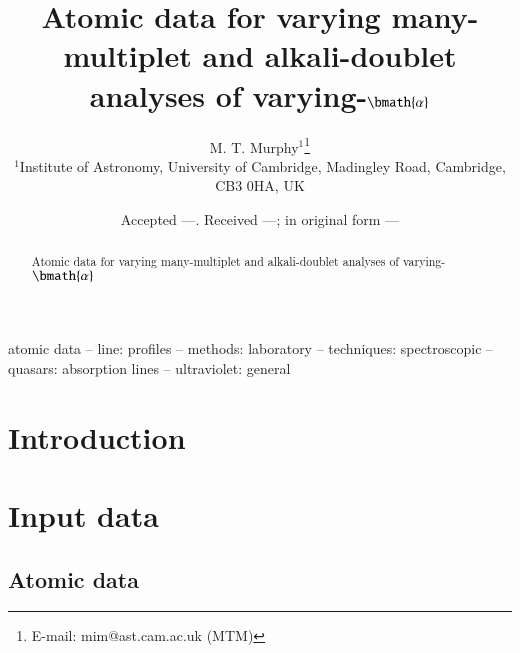 \documentclass[useAMS,usenatbib]{mn2e}
\title[Atomic data for varying $\alpha$ analysis]{Atomic data for
  varying many-multiplet and alkali-doublet analyses of
  varying-$\bmath{\alpha}$}
\author[M. T. Murphy]{
  M. T. Murphy$^{1}$\thanks{E-mail: mim@ast.cam.ac.uk (MTM)}\\
  $^{1}$Institute of Astronomy, University of Cambridge, Madingley Road,
  Cambridge, CB3 0HA, UK
}
\begin{document}
\date{Accepted ---. Received ---; in original form ---}

\pagerange{\pageref{firstpage}--\pageref{lastpage}} 

\maketitle

\label{firstpage}

\begin{abstract}
  Atomic data for varying many-multiplet and alkali-doublet analyses
  of varying-$\bmath{\alpha}$
\end{abstract}

\begin{keywords}
atomic data -- line: profiles -- methods: laboratory -- techniques:
spectroscopic -- quasars: absorption lines -- ultraviolet: general
\end{keywords}

\section{Introduction}\label{sec:intro}

\section{Input data}\label{sec:data}

\subsection{Atomic data}\label{ssec:atom_dat}
\end{document}
